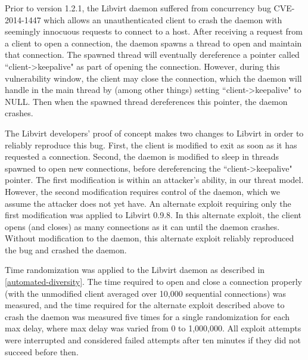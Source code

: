 Prior to version 1.2.1, the Libvirt daemon suffered from concurrency bug CVE-2014-1447 which allows an unauthenticated client to crash the daemon with seemingly innocuous requests to connect to a host.
After receiving a request from a client to open a connection, the daemon spawns a thread to open and maintain that connection.
The spawned thread will eventually dereference a pointer called ``client->keepalive" as part of opening the connection.
However, during this vulnerability window, the client may close the connection, which the daemon will handle in the main thread by (among other things) setting ``client->keepalive" to NULL.
Then when the spawned thread dereferences this pointer, the daemon crashes. \cite{RHELbug1047577}

The Libvirt developers' proof of concept makes two changes to Libvirt in order to reliably reproduce this bug.
First, the client is modified to exit as soon as it has requested a connection.
Second, the daemon is modified to sleep in threads spawned to open new connections, before dereferencing the ``client->keepalive" pointer.
The first modification is within an attacker's ability, in our threat model.
However, the second modification requires control of the daemon, which we assume the attacker does not yet have.
An alternate exploit requiring only the first modification was applied to Libvirt 0.9.8.
In this alternate exploit, the client opens (and closes) as many connections as it can until the daemon crashes.
Without modification to the daemon, this alternate exploit reliably reproduced the bug and crashed the daemon.

Time randomization was applied to the Libvirt daemon as described in \autoref{automated-diversity}.
The time required to open and close a connection properly (with the unmodified client averaged over 10,000 sequential connections) was measured, and the time required for the alternate exploit described above to crash the daemon was measured five times for a single randomization for each max delay, where max delay was varied from 0 to 1,000,000.
All exploit attempts were interrupted and considered failed attempts after ten minutes if they did not succeed before then.